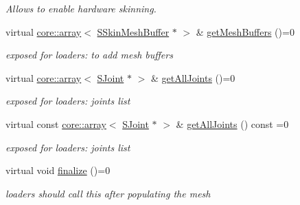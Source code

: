 \begin{DoxyCompactItemize}
\begin{DoxyCompactList}\small\item\em Allows to enable hardware skinning. \end{DoxyCompactList}\item 
\mbox{\label{classirr_1_1scene_1_1ISkinnedMesh_a5c46b784d6e8b7479e6f630377ab42ef}} 
virtual \hyperlink{classirr_1_1core_1_1array}{core\+::array}$<$ \hyperlink{structirr_1_1scene_1_1SSkinMeshBuffer}{S\+Skin\+Mesh\+Buffer} $\ast$ $>$ \& \hyperlink{classirr_1_1scene_1_1ISkinnedMesh_a5c46b784d6e8b7479e6f630377ab42ef}{get\+Mesh\+Buffers} ()=0
\begin{DoxyCompactList}\small\item\em exposed for loaders\+: to add mesh buffers \end{DoxyCompactList}\item 
\mbox{\label{classirr_1_1scene_1_1ISkinnedMesh_a4fcdc38666f24a092191668ff909936f}} 
virtual \hyperlink{classirr_1_1core_1_1array}{core\+::array}$<$ \hyperlink{structirr_1_1scene_1_1ISkinnedMesh_1_1SJoint}{S\+Joint} $\ast$ $>$ \& \hyperlink{classirr_1_1scene_1_1ISkinnedMesh_a4fcdc38666f24a092191668ff909936f}{get\+All\+Joints} ()=0
\begin{DoxyCompactList}\small\item\em exposed for loaders\+: joints list \end{DoxyCompactList}\item 
\mbox{\label{classirr_1_1scene_1_1ISkinnedMesh_a8dcc5dc083cd93a349acd0a2e01da539}} 
virtual const \hyperlink{classirr_1_1core_1_1array}{core\+::array}$<$ \hyperlink{structirr_1_1scene_1_1ISkinnedMesh_1_1SJoint}{S\+Joint} $\ast$ $>$ \& \hyperlink{classirr_1_1scene_1_1ISkinnedMesh_a8dcc5dc083cd93a349acd0a2e01da539}{get\+All\+Joints} () const =0
\begin{DoxyCompactList}\small\item\em exposed for loaders\+: joints list \end{DoxyCompactList}\item 
\mbox{\label{classirr_1_1scene_1_1ISkinnedMesh_a83549df06904513c439c92e34b424b02}} 
virtual void \hyperlink{classirr_1_1scene_1_1ISkinnedMesh_a83549df06904513c439c92e34b424b02}{finalize} ()=0
\begin{DoxyCompactList}\small\item\em loaders should call this after populating the mesh \end{DoxyCompactList}\item 

\end{DoxyCompactItemize}
